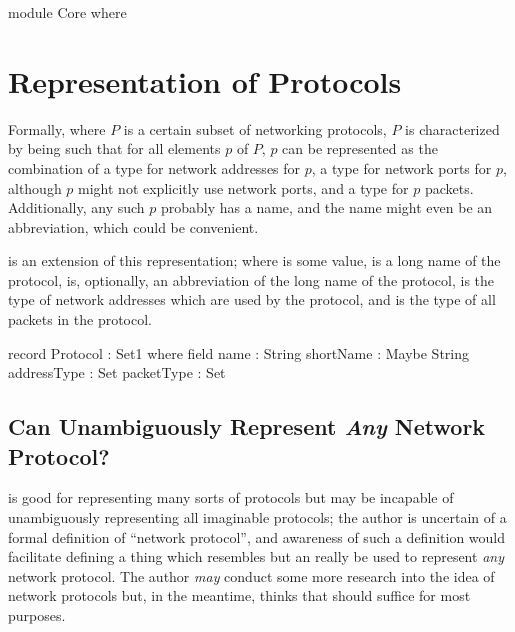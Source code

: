 \documentclass{report}
\begin{document}
\begin{code}
module Core where
\end{code}

\chapter{Representation of Protocols}
Formally, where \(P\) is a certain subset of networking protocols, \(P\) is characterized by being such that for all elements \(p\) of \(P\), \(p\) can be represented as the combination of a type for network addresses for \(p\), a type for network ports for \(p\), although \(p\) might not explicitly use network ports, and a type for \(p\) packets.  Additionally, any such \(p\) probably has a name, and the name might even be an abbreviation, which could be convenient.

 is an extension of this representation; where  is some  value,   is a long name of the  protocol,   is, optionally, an abbreviation of the long name of the  protocol,   is the type of network addresses which are used by the  protocol, and   is the type of all packets in the  protocol.

\begin{code}
  record Protocol : Set1 where
    field
      name : String
      shortName : Maybe String
      addressType : Set
      packetType : Set
\end{code}

\section{Can  Unambiguously Represent \emph{Any} Network Protocol?}
 is good for representing many sorts of protocols but may be incapable of unambiguously representing all imaginable protocols; the author is uncertain of a formal definition of ``network protocol'', and awareness of such a definition would facilitate defining a thing which resembles  but an really be used to represent \emph{any} network protocol.  The author \emph{may} conduct some more research into the idea of network protocols but, in the meantime, thinks that  should suffice for most purposes.
\end{document}
